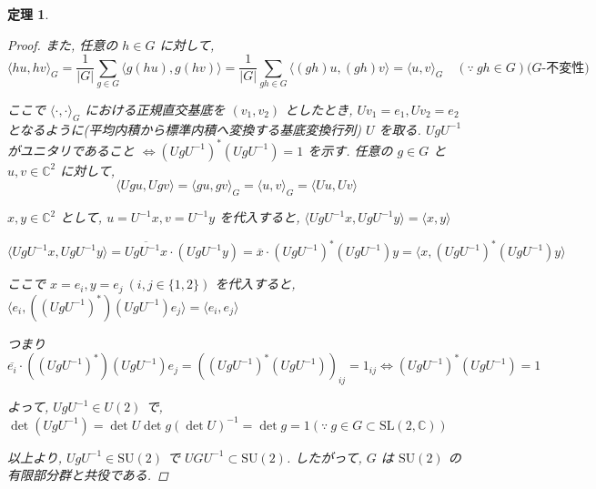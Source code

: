 \documentclass[xelatex,a4paper,ja=standard]{bxjsreport}
\newtheorem{theorem}[definition]{定理}%
\begin{document}
\begin{theorem}
\begin{proof}
        また, 任意の \(h \in G\) に対して,
        \[\langle hu, hv \rangle_G = \frac{1}{|G|}\sum_{g \in G} \langle g(hu), g(hv) \rangle
        = \frac{1}{|G|}\sum_{gh \in G} \langle (gh)u, (gh)v \rangle
        = \langle u, v \rangle_G \quad (\because ~ gh \in G) \text{(\(G\)-不変性)}\]

        ここで \(\langle \cdot, \cdot \rangle_G\) における正規直交基底を \((v_1, v_2)\) としたとき, 
        \(Uv_1 = e_1, Uv_2 = e_2\) となるように(平均内積から標準内積へ変換する基底変換行列) \(U\) を取る.
        \(UgU^{-1}\) がユニタリであること \(\Leftrightarrow (UgU^{-1})^* (UgU^{-1}) = 1\) を示す.
        任意の \(g \in G\) と \(u, v \in \mathbb{C}^2\) に対して,
        \[\langle Ugu, Ugv \rangle = \langle gu, gv \rangle_G
        = \langle u, v \rangle_G = \langle Uu, Uv \rangle\]

        \(x, y \in \mathbb{C}^2\) として,  \(u = U^{-1}x, v = U^{-1}y\) を代入すると,
        \(\langle UgU^{-1}x, UgU^{-1}y \rangle = \langle x, y \rangle\)

        \(\langle UgU^{-1}x, UgU^{-1}y \rangle = \overline{UgU^{-1}x} \cdot (UgU^{-1}y)
        = \overline{x} \cdot (UgU^{-1})^* (UgU^{-1})y
        = \langle x, (UgU^{-1})^* (UgU^{-1}) y \rangle\)

        ここで \(x = e_i, y = e_j ~ (i, j \in \{1, 2\})\) を代入すると,
        \(\langle e_i, ((UgU^{-1})^*)(UgU^{-1})e_j \rangle = \langle e_i, e_j \rangle\)

        つまり \(\overline{e_i} \cdot ((UgU^{-1})^*)(UgU^{-1})e_j = ((UgU^{-1})^*(UgU^{-1}))_{ij} = 1_{ij}
        \Leftrightarrow (UgU^{-1})^* (UgU^{-1}) = 1\)

        よって, \(UgU^{-1} \in U(2)\) で, \(\det(UgU^{-1}) = \det U \det g (\det U)^{-1}
        = \det g = 1 (\because ~ g \in G \subset \mathrm{SL}(2, \mathbb{C}))\)
        
        以上より, \(UgU^{-1} \in \mathrm{SU}(2)\) で \(UGU^{-1} \subset \mathrm{SU}(2)\).
        したがって, \(G\) は \(\mathrm{SU}(2)\) の有限部分群と共役である.
    \end{proof}
\end{theorem}
\end{document}
